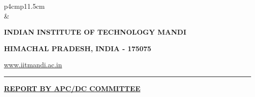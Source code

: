 \documentclass[12 pt, a4paper]{article}
\newcommand{\HRule}{\rule{\linewidth}{1mm}}
\begin{document}
	\pagestyle{empty}
	\vskip 0.2cm
	\begin{tabular}{p{4cm}p{11.5cm}}
		  \\
		& \centering \large\bf\phantom{Empty line}\\ 
		\rule{0pt}{1pt} \centering \large\bf{INDIAN INSTITUTE OF TECHNOLOGY MANDI} \\
		\rule{0pt}{1pt} \centering \large\bf{HIMACHAL PRADESH, INDIA - 175075} \\
		\rule{0pt}{1pt} \centering \underline{\href{www.iitmandi.ac.in}{www.iitmandi.ac.in}}\\
	\end{tabular}
\noindent

{\raggedleft{}\HRule}
	\begin{center}
	\large\bf{\underline{REPORT BY APC/DC COMMITTEE}} 
	\end{center}
\end{document}

